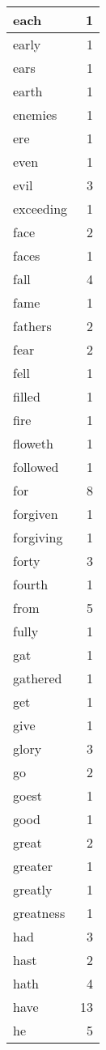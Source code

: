\begin{center}
\begin{longtable}{l|r}
each & 1 \\ \hline
early & 1 \\ \hline
ears & 1 \\ \hline
earth & 1 \\ \hline
enemies & 1 \\ \hline
ere & 1 \\ \hline
even & 1 \\ \hline
evil & 3 \\ \hline
exceeding & 1 \\ \hline
face & 2 \\ \hline
faces & 1 \\ \hline
fall & 4 \\ \hline
fame & 1 \\ \hline
fathers & 2 \\ \hline
fear & 2 \\ \hline
fell & 1 \\ \hline
filled & 1 \\ \hline
fire & 1 \\ \hline
floweth & 1 \\ \hline
followed & 1 \\ \hline
for & 8 \\ \hline
forgiven & 1 \\ \hline
forgiving & 1 \\ \hline
forty & 3 \\ \hline
fourth & 1 \\ \hline
from & 5 \\ \hline
fully & 1 \\ \hline
gat & 1 \\ \hline
gathered & 1 \\ \hline
get & 1 \\ \hline
give & 1 \\ \hline
glory & 3 \\ \hline
go & 2 \\ \hline
goest & 1 \\ \hline
good & 1 \\ \hline
great & 2 \\ \hline
greater & 1 \\ \hline
greatly & 1 \\ \hline
greatness & 1 \\ \hline
had & 3 \\ \hline
hast & 2 \\ \hline
hath & 4 \\ \hline
have & 13 \\ \hline
he & 5 \\ \hline

\end{longtable}
\end{center}
